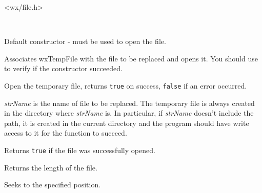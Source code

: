 
<wx/file.h>


\\


\label{wxtempfilewxtempfilector}


Default constructor -  must be used to open the
file.

\label{wxtempfilewxtempfile}


Associates wxTempFile with the file to be replaced and opens it. You should use 
 to verify if the constructor succeeded.

\label{wxtempfileopen}


Open the temporary file, returns {\tt true} on success, {\tt false} if an error
occurred.

{\it strName} is the name of file to be replaced. The temporary file is always
created in the directory where {\it strName} is. In particular, if 
{\it strName} doesn't include the path, it is created in the current directory
and the program should have write access to it for the function to succeed.

\label{wxtempfileisopened}


Returns {\tt true} if the file was successfully opened.

\label{wxtempfilelength}


Returns the length of the file.

\label{wxtempfileseek}


Seeks to the specified position.

